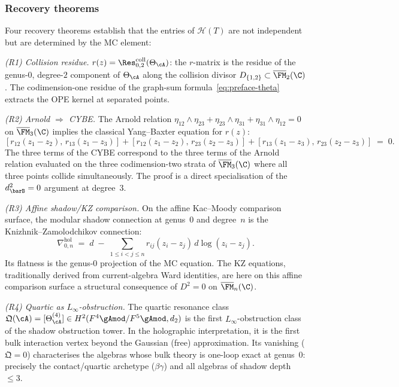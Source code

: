 \subsubsection*{Recovery theorems}

Four recovery theorems establish that the entries of
$\mathcal H(T)$ are not independent but are determined by
the MC element:

\smallskip\noindent
\emph{(R1) Collision residue.}\enspace
$r(z)=\Res^{\mathrm{coll}}_{0,2}(\Theta_\cA)$: the $r$-matrix
is the residue of the genus-$0$, degree-$2$ component of
$\Theta_\cA$ along the collision divisor
$D_{\{1,2\}}\subset\overline{\FM}_2(\C)$. The codimension-one
residue of the graph-sum formula~\eqref{eq:preface-theta}
extracts the OPE kernel at separated points.

\smallskip\noindent
\emph{(R2) Arnold $\Rightarrow$ CYBE.}\enspace
The Arnold relation
$\eta_{12}\wedge\eta_{23}+\eta_{23}\wedge\eta_{31}
+\eta_{31}\wedge\eta_{12}=0$
on $\overline{\FM}_3(\C)$ implies the classical Yang--Baxter
equation for $r(z)$:
\[
[r_{12}(z_1-z_2),\,r_{13}(z_1-z_3)]
+[r_{12}(z_1-z_2),\,r_{23}(z_2-z_3)]
+[r_{13}(z_1-z_3),\,r_{23}(z_2-z_3)]
\;=\;0.
\]
The three terms of the CYBE correspond to the three terms of
the Arnold relation evaluated on the three codimension-two strata
of $\overline{\FM}_3(\C)$ where all three points collide
simultaneously. The proof is a direct specialisation of the
$d_{\barB}^2=0$ argument at degree~$3$.

\smallskip\noindent
\emph{(R3) Affine shadow/KZ comparison.}\enspace
On the affine Kac--Moody comparison surface, the modular shadow
connection at genus~$0$ and degree~$n$ is the
Knizhnik--Zamolodchikov connection:
\[
\nabla^{\mathrm{hol}}_{0,n}
\;=\;
d\;-\;\sum_{1\le i<j\le n}r_{ij}(z_i-z_j)\,d\log(z_i-z_j).
\]
Its flatness is the genus-$0$ projection of the MC equation.
The KZ equations, traditionally derived from current-algebra
Ward identities, are here on this affine comparison surface a
structural consequence of $D^2=0$
on $\overline{\FM}_n(\C)$.

\smallskip\noindent
\emph{(R4) Quartic as $L_\infty$-obstruction.}\enspace
The quartic resonance class
$\mathfrak Q(\cA)=[\Theta_\cA^{(4)}]
\in H^2(F^4\gAmod/F^5\gAmod,d_2)$
is the first $L_\infty$-obstruction class of the shadow obstruction tower.
In the holographic interpretation, it is the first bulk
interaction vertex beyond the Gaussian (free) approximation.
Its vanishing ($\mathfrak Q=0$) characterises the algebras
whose bulk theory is one-loop exact at genus~$0$: precisely the
contact/quartic archetype ($\beta\gamma$) and all algebras of
shadow depth~$\le 3$.

